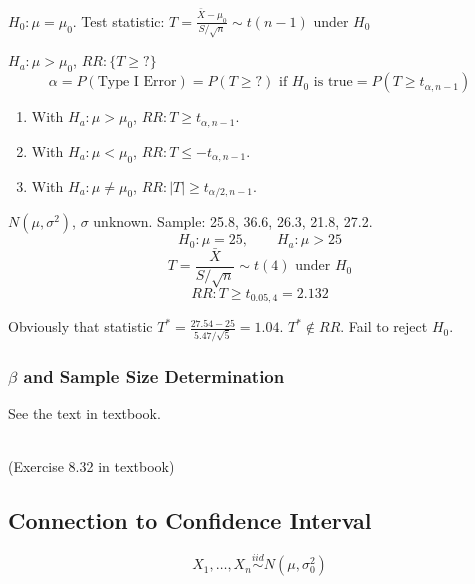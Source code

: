 $H_0:\mu=\mu_0$. Test statistic: $T=\frac{\bar{X}-\mu_0}{S/\sqrt{n}} \sim t(n-1) \text{ under } H_0$

$H_a: \mu>\mu_0$, $RR:\{T\geq ?\}$
\[\alpha=P(\text{Type I Error})=P(T\geq ?) \text{ if }H_0\text{ is true} =P(T\geq t_{\alpha,n-1}) \]

\begin{enumerate}
\item With $H_a: \mu>\mu_0$, $RR:T\geq t_{\alpha,n-1}$.
\item With $H_a: \mu<\mu_0$, $RR:T\leq -t_{\alpha,n-1}$.
\item With $H_a: \mu\neq\mu_0$, $RR:|T|\geq t_{\alpha/2,n-1}$.
\end{enumerate}

\begin{exmp}
$N(\mu,\sigma^2)$, $\sigma$ unknown. Sample: 25.8, 36.6, 26.3, 21.8, 27.2.
\[H_0:\mu=25, \qquad H_a:\mu>25 \]
\[T=\frac{\bar{X}}{S/\sqrt{n}} \sim t(4) \text{ under } H_0\]
\[RR:T\geq t_{0.05,4}=2.132\]

Obviously that statistic $T^*=\frac{27.54-25}{5.47/\sqrt{5}}=1.04$. $T^* \notin RR$. Fail to reject $H_0$.
\end{exmp}

\subsubsection{$\beta$ and Sample Size Determination}
See the text in textbook. \\ \\

\noindent{}

\begin{exmp}
(Exercise 8.32 in textbook)
\end{exmp}

\subsection{Connection to Confidence Interval}
\[X_1,\dots,X_n \overset{iid}{\sim} N(\mu,\sigma_0^2)\]

